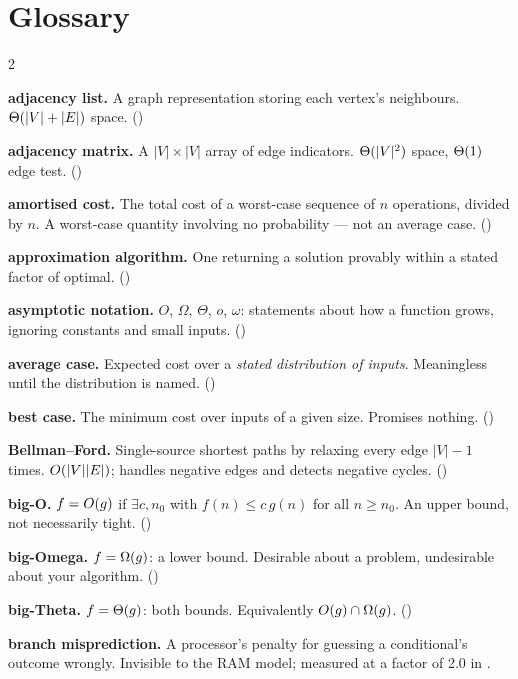\chapter{Glossary}\label{app:glossary}
\normalfigures

\begin{multicols}{2}
\small
\raggedright

\textbf{adjacency list.} A graph representation storing each vertex's
neighbours. $\Theta(|V|+|E|)$ space. ()

\textbf{adjacency matrix.} A $|V| \times |V|$ array of edge indicators.
$\Theta(|V|^{2})$ space, $\Theta(1)$ edge test. ()

\textbf{amortised cost.} The total cost of a worst-case sequence of $n$
operations, divided by $n$. A worst-case quantity involving no probability ---
not an average case. ()

\textbf{approximation algorithm.} One returning a solution provably within a
stated factor of optimal. ()

\textbf{asymptotic notation.} $O$, $\Omega$, $\Theta$, $o$, $\omega$:
statements about how a function grows, ignoring constants and small inputs.
()

\textbf{average case.} Expected cost over a \emph{stated distribution of
inputs}. Meaningless until the distribution is named. ()

\textbf{best case.} The minimum cost over inputs of a given size. Promises
nothing. ()

\textbf{Bellman--Ford.} Single-source shortest paths by relaxing every edge
$|V|-1$ times. $O(|V||E|)$; handles negative edges and detects negative
cycles. ()

\textbf{big-O.} $f = O(g)$ if $\exists c, n_{0}$ with
$f(n) \le c\,g(n)$ for all $n \ge n_{0}$. An upper bound, not necessarily
tight. ()

\textbf{big-Omega.} $f = \Omega(g)$: a lower bound. Desirable about a problem,
undesirable about your algorithm. ()

\textbf{big-Theta.} $f = \Theta(g)$: both bounds. Equivalently
$O(g) \cap \Omega(g)$. ()

\textbf{branch misprediction.} A processor's penalty for guessing a
conditional's outcome wrongly. Invisible to the RAM model; measured at a
factor of 2.0 in .


\end{multicols}
